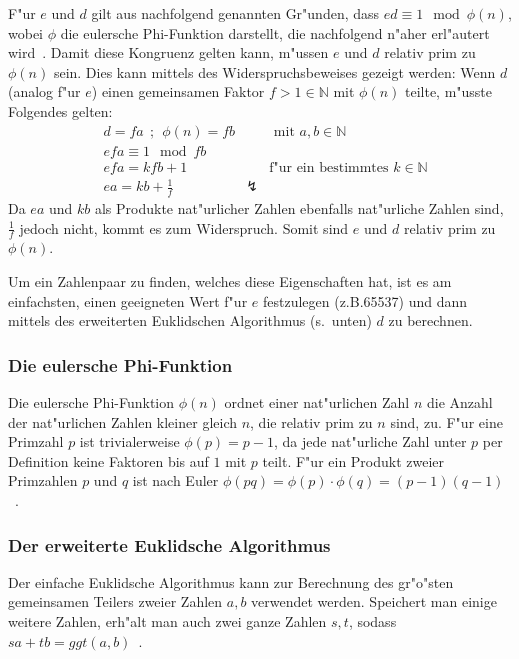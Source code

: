 \documentclass[12pt]{article}
\begin{document}
F"ur $e$ und $d$ gilt aus nachfolgend genannten Gr"unden, dass $ed \equiv 1 \mod \phi(n)$,
wobei $\phi$ die eulersche Phi-Funktion darstellt, die nachfolgend n"aher erl"autert wird~\cite{rsa}.
Damit diese Kongruenz gelten kann, m"ussen $e$ und $d$ relativ prim zu $\phi(n)$ sein.
Dies kann mittels des Widerspruchsbeweises gezeigt werden:
Wenn $d$ (analog f"ur $e$) einen gemeinsamen Faktor $f > 1 \in \mathbb{N}$ mit $\phi(n)$ teilte, m"usste Folgendes gelten:
\[
\begin{aligned}
&d = fa ~~;~~ \phi(n) = fb && \textrm{ mit } a, b \in \mathbb{N} \\
&efa \equiv 1 \mod fb \\
&efa = kfb + 1 && \textrm{f"ur ein bestimmtes } k \in \mathbb{N} \\
&ea = kb + \frac{1}{f} & \lightning &
\end{aligned}
\]
Da $ea$ und $kb$ als Produkte nat"urlicher Zahlen ebenfalls nat"urliche Zahlen sind, $\frac{1}{f}$ jedoch nicht, kommt es zum Widerspruch.
Somit sind $e$ und $d$ relativ prim zu $\phi(n)$.

Um ein Zahlenpaar zu finden, welches diese Eigenschaften hat,
ist es am einfachsten, einen geeigneten Wert f"ur $e$ festzulegen (z.B.\@ 65537)
und dann mittels des erweiterten Euklidschen Algorithmus (s.~unten) $d$ zu berechnen.

\subsubsection{Die eulersche Phi-Funktion}
Die eulersche Phi-Funktion $\phi(n)$ ordnet einer nat"urlichen Zahl $n$ die Anzahl
der nat"urlichen Zahlen kleiner gleich $n$, die relativ prim zu $n$ sind, zu.
F"ur eine Primzahl $p$ ist trivialerweise $\phi(p) = p-1$,
da jede nat"urliche Zahl unter $p$ per Definition keine Faktoren bis auf $1$ mit $p$ teilt.
F"ur ein Produkt zweier Primzahlen $p$ und $q$ ist nach Euler
$\phi(pq) = \phi(p) \cdot \phi(q) = (p-1)(q-1)$~\cite{euler63}.

\subsubsection{Der erweiterte Euklidsche Algorithmus}
Der einfache Euklidsche Algorithmus kann zur Berechnung des gr"o"sten gemeinsamen
Teilers zweier Zahlen $a, b$ verwendet werden.
Speichert man einige weitere Zahlen, erh"alt man auch zwei ganze Zahlen $s, t$, sodass
$sa + tb = ggt(a, b)$~\cite{taocp2}.
\end{document}
